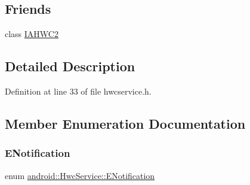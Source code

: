 \subsection*{Friends}
\begin{DoxyCompactItemize}
\item 
class \mbox{\hyperlink{classandroid_1_1HwcService_a20f0fd2b9eaf2e89f95db870a0156930}{I\+A\+H\+W\+C2}}
\end{DoxyCompactItemize}


\subsection{Detailed Description}


Definition at line 33 of file hwcservice.\+h.



\subsection{Member Enumeration Documentation}
\mbox{\label{classandroid_1_1HwcService_a34049a831dd1c85ef002e59be99d1bd8}} 
\subsubsection{\texorpdfstring{E\+Notification}{ENotification}}
{\footnotesize\ttfamily enum \mbox{\hyperlink{classandroid_1_1HwcService_a34049a831dd1c85ef002e59be99d1bd8}{android\+::\+Hwc\+Service\+::\+E\+Notification}}}

